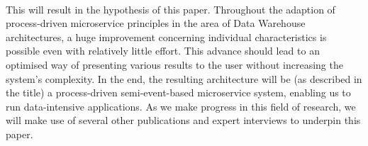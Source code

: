 \\
This will result in the hypothesis of this paper. Throughout the adaption of process-driven microservice principles in the area of Data Warehouse architectures, a huge improvement concerning individual characteristics is possible even with relatively little effort. This advance should lead to an optimised way of presenting various results to the user without increasing the system's complexity.\newline 
In the end, the resulting architecture will be (as described in the title) a process-driven semi-event-based microservice system, enabling us to run data-intensive applications. \newline
As we make progress in this field of research, we will make use of several other publications and expert interviews to underpin this paper. 